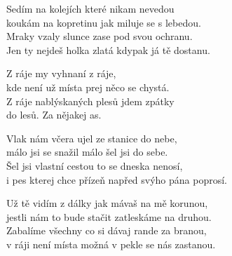 
\ve{}
Sedím na kolejích které nikam nevedou \\
koukám na kopretinu jak miluje se s lebedou. \\
Mraky vzaly slunce zase pod svou ochranu. \\
Jen ty nejdeš holka zlatá kdypak já tě dostanu. 

\cho{}
Z ráje my vyhnaní z ráje,\\
kde není už místa prej něco se chystá.\\
Z ráje nablýskaných plesů jdem zpátky\\
do lesů. Za nějakej as.

\ve{} 
Vlak nám včera ujel ze stanice do nebe,\\
málo jsi se snažil málo šel jsi do sebe.\\
Šel jsi vlastní cestou to se dneska nenosí,\\
i pes kterej chce přízeň napřed svýho pána poprosí.

\cho{}

\ve{} 
Už tě vidím z dálky jak mávaš na mě korunou,\\
jestli nám to bude stačit zatleskáme na druhou.\\
Zabalíme všechny co si dávaj rande za branou,\\
v ráji není místa možná v pekle se nás zastanou.

\cho{}

\esong{}
